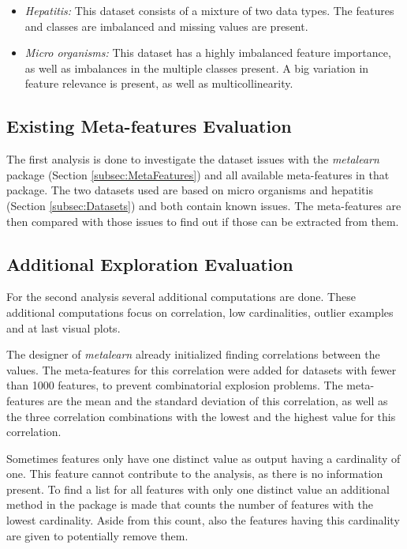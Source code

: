 \documentclass[10pt,a4paper]{article}
\begin{document}
	\begin{itemize}
		\item \textit{Hepatitis:} This dataset consists of a mixture of two data types. The features and classes are imbalanced and missing values are present.
		\item \textit{Micro organisms:} This dataset has a highly imbalanced feature importance, as well as imbalances in the multiple classes present. A big variation in feature relevance is present, as well as multicollinearity.
	\end{itemize}
	
	\subsection{Existing Meta-features Evaluation}
	\label{subsec:MethodsExistingEvaluation}
	
	The first analysis is done to investigate the dataset issues with the \textit{metalearn} package (Section \ref{subsec:MetaFeatures}) and all available meta-features in that package. The two datasets used are based on micro organisms and hepatitis (Section \ref{subsec:Datasets}) and both contain known issues. The meta-features are then compared with those issues to find out if those can be extracted from them.
	
	\subsection{Additional Exploration Evaluation}
	\label{subsec:MethodsAdditionalEvaluation}	
		
	For the second analysis several additional computations are done. These additional computations focus on correlation, low cardinalities, outlier examples and at last visual plots.
	
	The designer of \textit{metalearn} already initialized finding correlations between the values. The meta-features for this correlation were added for datasets with fewer than 1000 features, to prevent combinatorial explosion problems. The meta-features are the mean and the standard deviation of this correlation, as well as the three correlation combinations with the lowest and the highest value for this correlation.
	
	Sometimes features only have one distinct value as output having a cardinality of one. This feature cannot contribute to the analysis, as there is no information present. To find a list for all features with only one distinct value an additional method in the package is made that counts the number of features with the lowest cardinality. Aside from this count, also the features having this cardinality are given to potentially remove them.
	
\end{document}
